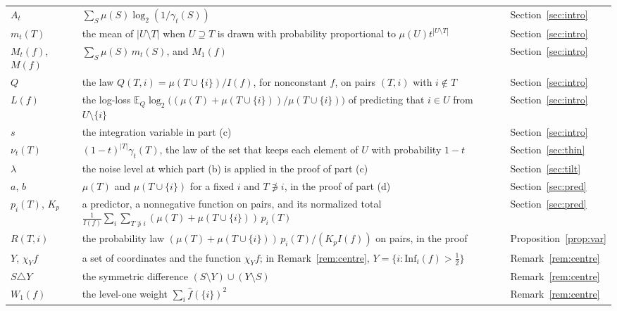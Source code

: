 \documentclass[11pt]{amsart}
\theoremstyle{remark}
\newcommand{\Inf}{\mathrm{Inf}}
\newcommand{\E}{\mathbb{E}}
\begin{document}
\begin{longtable}{@{}>{\raggedright\arraybackslash}p{}>{\raggedright\arraybackslash}p{}>{\raggedright\arraybackslash}p{}@{}}
$A_t$ & $\sum_S\mu(S)\log_2(1/\gamma_t(S))$ & Section~\ref{sec:intro} \\
$m_t(T)$ & the mean of $|U\setminus T|$ when $U\supseteq T$ is drawn with probability proportional to $\mu(U)t^{|U\setminus T|}$ & Section~\ref{sec:intro} \\
$M_t(f)$, $M(f)$ & $\sum_S\mu(S)\,m_t(S)$, and $M_1(f)$ & Section~\ref{sec:intro} \\
$Q$ & the law $Q(T,i)=\mu(T\cup\{i\})/I(f)$, for nonconstant $f$, on pairs $(T,i)$ with $i\notin T$ & Section~\ref{sec:intro} \\
$L(f)$ & the log-loss $\E_Q\log_2\bigl((\mu(T)+\mu(T\cup\{i\}))/\mu(T\cup\{i\})\bigr)$ of predicting that $i\in U$ from $U\setminus\{i\}$ & Section~\ref{sec:intro} \\
$s$ & the integration variable in part (c) & Section~\ref{sec:intro} \\
$\nu_t(T)$ & $(1-t)^{|T|}\gamma_t(T)$, the law of the set that keeps each element of $U$ with probability $1-t$ & Section~\ref{sec:thin} \\
$\lambda$ & the noise level at which part (b) is applied in the proof of part (c) & Section~\ref{sec:tilt} \\
$a$, $b$ & $\mu(T)$ and $\mu(T\cup\{i\})$ for a fixed $i$ and $T\not\ni i$, in the proof of part (d) & Section~\ref{sec:pred} \\
$p_i(T)$, $K_p$ & a predictor, a nonnegative function on pairs, and its normalized total $\frac1{I(f)}\sum_i\sum_{T\not\ni i}(\mu(T)+\mu(T\cup\{i\}))\,p_i(T)$ & Section~\ref{sec:pred} \\
$R(T,i)$ & the probability law $(\mu(T)+\mu(T\cup\{i\}))\,p_i(T)/(K_pI(f))$ on pairs, in the proof & Proposition~\ref{prop:var} \\
$Y$, $\chi_Yf$ & a set of coordinates and the function $\chi_Y f$; in Remark~\ref{rem:centre}, $Y=\{i:\Inf_i(f)>\tfrac12\}$ & Remark~\ref{rem:centre} \\
$S\triangle Y$ & the symmetric difference $(S\setminus Y)\cup(Y\setminus S)$ & Remark~\ref{rem:centre} \\
$W_1(f)$ & the level-one weight $\sum_i\hat f(\{i\})^2$ & Remark~\ref{rem:centre} \\
\bottomrule
\end{longtable}
\end{document}
